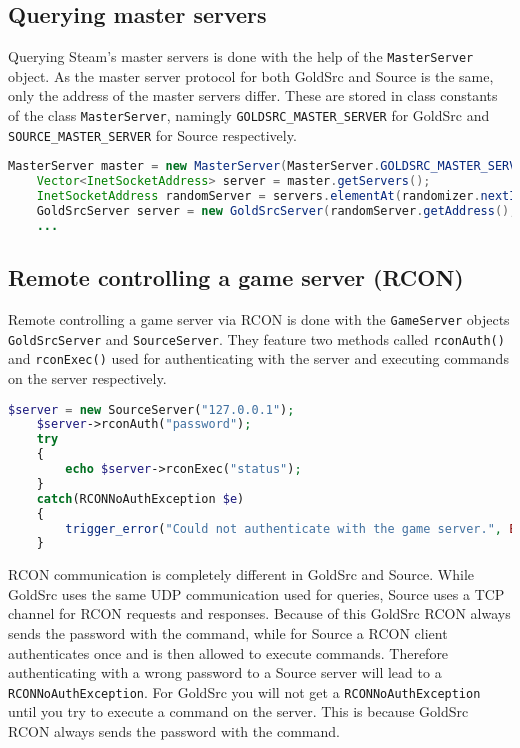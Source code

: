 \documentclass[draft=false, fontsize=12pt, oneside, paper=a4, DIV15,
twocolumn=false, footsepline, headsepline, titlepage, parskip=half]{scrreprt}
\begin{document}
\subsection{Querying master servers}
Querying Steam's master servers is done with the help of the
\lstinline{MasterServer} object. As the master server protocol for both
GoldSrc and Source is the same, only the address of the master servers
differ. These are stored in class constants of the class
\lstinline{MasterServer}, namingly \lstinline{GOLDSRC_MASTER_SERVER} for
GoldSrc and \lstinline{SOURCE_MASTER_SERVER} for Source respectively.

\begin{lstlisting}[caption=Querying the GoldSrc master server and getting a
	random GoldSrc server in Java, language=Java]
	MasterServer master = new MasterServer(MasterServer.GOLDSRC_MASTER_SERVER);
	Vector<InetSocketAddress> server = master.getServers();
	InetSocketAddress randomServer = servers.elementAt(randomizer.nextInt(servers.size()));
	GoldSrcServer server = new GoldSrcServer(randomServer.getAddress(), randomServer.getPort());
	...
\end{lstlisting}

\subsection{Remote controlling a game server (RCON)}
Remote controlling a game server via RCON is done with
the \lstinline{GameServer} objects \lstinline{GoldSrcServer} and
\lstinline{SourceServer}. They feature two methods called
\lstinline{rconAuth()} and \lstinline{rconExec()} used for authenticating with
the server and executing commands on the server respectively.

\begin{lstlisting}[caption=Executing the command \lstinline{status} on a local Source
	server and displaying the output, language=PHP]
	$server = new SourceServer("127.0.0.1");
	$server->rconAuth("password");
	try
	{
		echo $server->rconExec("status");
	}
	catch(RCONNoAuthException $e)
	{
		trigger_error("Could not authenticate with the game server.", E_USER_ERROR);
	}
\end{lstlisting}

RCON communication is completely different in GoldSrc and Source. While GoldSrc
uses the same UDP communication used for queries, Source uses a TCP channel
for RCON requests and responses. Because of this GoldSrc RCON always sends the
password with the command, while for Source a RCON client authenticates once
and is then allowed to execute commands. Therefore authenticating with a wrong
password to a Source server will lead to a \lstinline{RCONNoAuthException}. For
GoldSrc you will not get a \lstinline{RCONNoAuthException} until you try to 
execute a command on the server. This is because GoldSrc RCON always sends the
password with the command.
\end{document}
